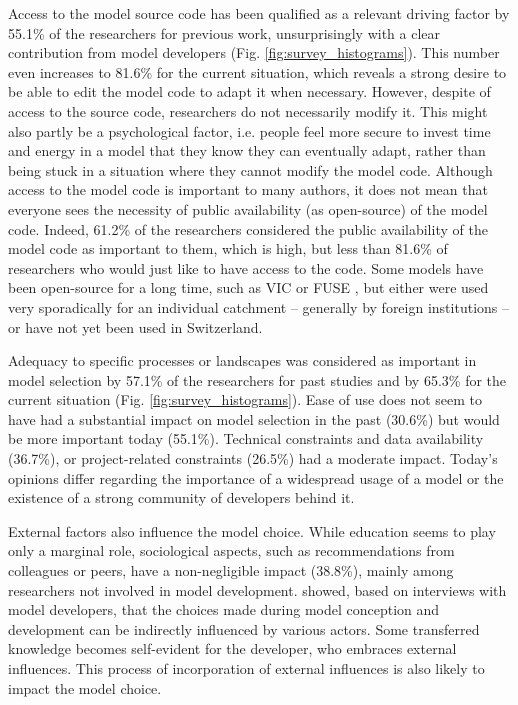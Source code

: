 \documentclass[10pt,a4paper]{article}
\begin{document}
Access to the model source code has been qualified as a relevant driving factor by 55.1\% of the researchers for previous work, unsurprisingly with a clear contribution from model developers (Fig. \ref{fig:survey_histograms}). This number even increases to 81.6\% for the current situation, which reveals a strong desire to be able to edit the model code to adapt it when necessary. However, despite of access to the source code, researchers do not necessarily modify it. This might also partly be a psychological factor, i.e. people feel more secure to invest time and energy in a model that they know they can eventually adapt, rather than being stuck in a situation where they cannot modify the model code. Although access to the model code is important to many authors, it does not mean that everyone sees the necessity of public availability (as open-source) of the model code. Indeed, 61.2\% of the researchers considered the public availability of the model code as important to them, which is high, but less than 81.6\% of researchers who would just like to have access to the code. Some models have been open-source for a long time, such as VIC or FUSE \citep{Clark2008}, but either were used very sporadically for an individual catchment -- generally by foreign institutions -- or have not yet been used in Switzerland.

Adequacy to specific processes or landscapes was considered as important in model selection by 57.1\% of the researchers for past studies and by 65.3\% for the current situation (Fig. \ref{fig:survey_histograms}). Ease of use does not seem to have had a substantial impact on model selection in the past (30.6\%) but would be more important today (55.1\%). Technical constraints and data availability (36.7\%), or project-related constraints (26.5\%) had a moderate impact. Today's opinions differ regarding the importance of a widespread usage of a model or the existence of a strong community of developers behind it. 

External factors also influence the model choice. While education seems to play only a marginal role, sociological aspects, such as recommendations from colleagues or peers, have a non-negligible impact (38.8\%), mainly among researchers not involved in model development. \citet{Babel2019} showed, based on interviews with model developers, that the choices made during model conception and development can be indirectly influenced by various actors. Some transferred knowledge becomes self-evident for the developer, who embraces external influences. This process of incorporation of external influences is also likely to impact the model choice.
\end{document}
